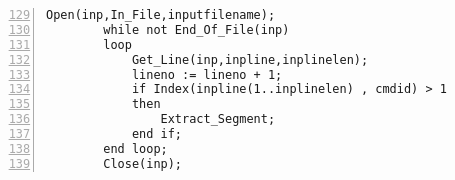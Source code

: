 \lstset{language=Ada, caption=impl.adb: Processing the input file}
\begin{tcolorbox}[width=\linewidth, sharp corners=all, colback=white!95!black]
\begin{lstlisting}[frame=single, numbers=left, numbersep=5pt, firstnumber= 129]
        Open(inp,In_File,inputfilename);
        while not End_Of_File(inp)
        loop
            Get_Line(inp,inpline,inplinelen);
            lineno := lineno + 1;
            if Index(inpline(1..inplinelen) , cmdid) > 1
            then
                Extract_Segment;
            end if;
        end loop;
        Close(inp);
\end{lstlisting}
\end{tcolorbox}
